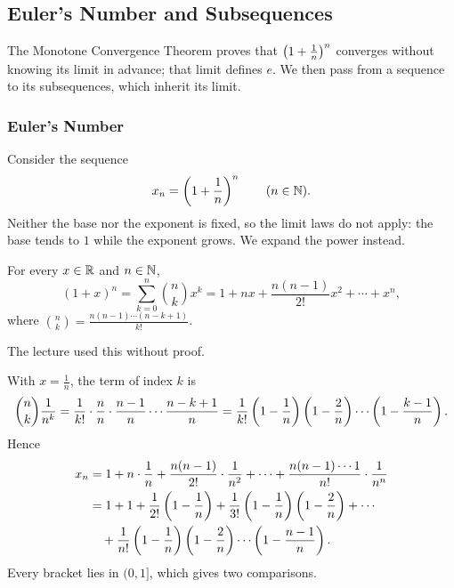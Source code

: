 \subsection{Euler's Number and Subsequences}
The Monotone Convergence Theorem proves that $\left(1+\frac1n\right)^n$ converges without knowing its limit in advance; that limit defines $e$. We then pass from a sequence to its subsequences, which inherit its limit.

\subsubsection{Euler's Number}
Consider the sequence
\begin{equation*}
    x_n = \left(1 + \frac{1}{n}\right)^n \qquad (n \in \mathbb{N}).
\end{equation*}
Neither the base nor the exponent is fixed, so the limit laws do not apply: the base tends to $1$ while the exponent grows. We expand the power instead.

\begin{theorem}\label{thm:binomial}
    For every $x\in\mathbb{R}$ and $n\in\mathbb{N}$,
    \begin{equation*}
        (1 + x)^n = \sum_{k=0}^{n}\binom nk x^k = 1 + nx + \frac{n(n - 1)}{2!}x^2 + \cdots + x^n,
    \end{equation*}
    where $\binom nk=\frac{n(n-1)\cdots(n-k+1)}{k!}$.
\end{theorem}
The lecture used this without proof.

With $x=\frac1n$, the term of index $k$ is
\begin{equation*}
    \binom nk\frac1{n^k}
    =\frac1{k!}\cdot\frac nn\cdot\frac{n-1}n\cdots\frac{n-k+1}n
    =\frac1{k!}\left(1-\frac1n\right)\left(1-\frac2n\right)\cdots\left(1-\frac{k-1}n\right).
\end{equation*}
Hence
\begin{align*}
    x_n &= 1 + n \cdot \frac{1}{n} + \frac{n(n - 1)}{2!} \cdot \frac{1}{n^2} + \cdots + \frac{n (n - 1) \cdots 1}{n!} \cdot \frac{1}{n^n}\\
    &= 1 + 1 + \frac{1}{2!}\left(1 - \frac{1}{n}\right) + \frac{1}{3!}\left(1 - \frac{1}{n}\right)\left(1 - \frac{2}{n}\right) + \cdots\\
    &\quad + \frac{1}{n!}\left(1 - \frac{1}{n}\right)\left(1 - \frac{2}{n}\right)\cdots\left(1 - \frac{n-1}{n}\right).
\end{align*}
Every bracket lies in $(0,1]$, which gives two comparisons.

